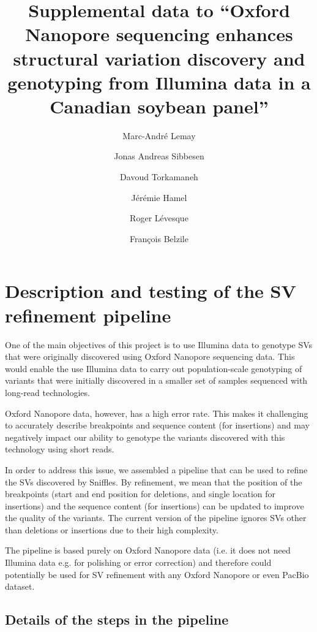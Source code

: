 \documentclass[12pt]{article}
\title{Supplemental data to ``Oxford Nanopore sequencing enhances structural variation discovery and genotyping from Illumina data in a Canadian soybean panel''}
\author{Marc-André Lemay \and Jonas Andreas Sibbesen \and Davoud Torkamaneh \and Jérémie Hamel \and Roger Lévesque \and François Belzile}
\date{}
\begin{document}
\maketitle \thispagestyle{empty}

\tableofcontents

\vspace{4ex}

\listoftables

\thispagestyle{empty}
\clearpage

\listoffigures

\thispagestyle{empty}

\clearpage

\section{Description and testing of the SV refinement pipeline}

One of the main objectives of this project is to use Illumina data to genotype SVs that were originally discovered using Oxford Nanopore sequencing data. 
This would enable the use Illumina data to carry out population-scale genotyping of variants that were initially discovered in a smaller set of samples sequenced with long-read technologies.

Oxford Nanopore data, however, has a high error rate.
This makes it challenging to accurately describe breakpoints and sequence content (for insertions) and may negatively impact our ability to genotype the variants discovered with this technology using short reads.

In order to address this issue, we assembled a pipeline that can be used to refine the SVs discovered by Sniffles.
By refinement, we mean that the position of the breakpoints (start and end position for deletions, and single location for insertions) and the sequence content (for insertions) can be updated to improve the quality of the variants. The current version of the pipeline ignores SVs other than deletions or insertions due to their high complexity.

The pipeline is based purely on Oxford Nanopore data (i.e. it does not need Illumina data e.g. for polishing or error correction) and therefore could potentially be used for SV refinement with any Oxford Nanopore or even PacBio dataset.

\subsection{Details of the steps in the pipeline}
\end{document}
